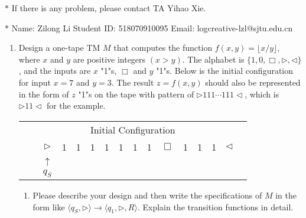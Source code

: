 \documentclass[12pt,a4paper]{article}
\theoremstyle{definition}
\begin{document}
\noindent

\noindent{}
\begin{center}
\footnotesize{\color{red}$*$ If there is any problem, please contact TA Yihao Xie. }

\footnotesize{\color{blue}$*$ Name: Zilong Li  \quad Student ID: 518070910095 \quad Email: logcreative-lzl@sjtu.edu.cn}
\end{center}

\begin{enumerate}
    \item Design a one-tape TM $M$ that computes the function $f(x, y) = \lfloor x/y \rfloor$, where $x$ and $y$ are positive integers $(x > y)$. The alphabet is $\{1, 0, \Box, \triangleright, \triangleleft\}$, and the inputs are $x$ "1"s, $\Box$ and $y$ "1"s. Below is the initial configuration for input $x=7$ and $y=3$. The result $z=f(x,y)$ should also be represented in the form of $z$ "1"s on the tape with pattern of $\rhd 111\cdots 111\lhd$, which is $\rhd 11\lhd$ for the example.
    
	\begin{center}
		\begin{tabular}{ll|c|c|c|c|c|c|c|c|c|c|c|c|c|c}
			& \multicolumn{14}{c}{Initial Configuration}\\[5pt]
			\cline{2-16}
			& & $\triangleright$ &  1  & 1 & 1 & 1 & 1 & 1 & 1 & $\Box$ & 1 & 1 & 1 & $ \triangleleft$ & \\
			\cline{2-16}
			\multicolumn{2}{c}{} & \multicolumn{1}{c}{$\uparrow$} & \multicolumn{11}{c}{}\\[-4px]
			\multicolumn{2}{c}{} & \multicolumn{1}{c}{$q_S$} & \multicolumn{11}{c}{}	
		\end{tabular}
	\end{center}

    \begin{enumerate}
	\item
	Please describe your design and then write the specifications of $M$ in the form like $\langle q_S, \triangleright \rangle \rightarrow \langle q_1, \triangleright,  R\rangle$. Explain the transition functions in detail.


\end{enumerate}
\end{enumerate}
\end{document}

